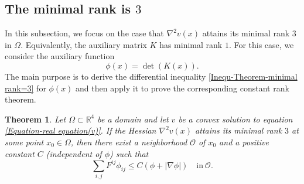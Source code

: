 \documentclass[11pt]{amsart}
\newtheorem{theorem}{Theorem}
\numberwithin{theorem}{section}
\numberwithin{equation}{section}
\begin{document}
\subsection{The minimal rank is $3$}\label{Section 3.2}
In this subsection, we focus on the case that $\nabla^2v(x)$ attains its minimal rank $3$ in $\Omega$. Equivalently, the auxiliary matrix $K$ has minimal rank $1$. For this case, we consider the auxiliary function $$\phi(x)=\det(K(x)). $$ The main purpose is to derive the differential inequality \eqref{Inequ-Theorem-minimal rank=3} for $\phi(x)$ and then apply it to prove the corresponding constant rank theorem.
\begin{theorem}\label{Theorem-minimal rank is 3}
Let $\Omega\subset\mathbb{R}^4$ be a domain and let $v$ be a convex solution to equation \eqref{Equation-real equation(v)}. If the Hessian $\nabla^2v(x)$ attains its minimal rank $3$ at some point $x_0\in\Omega$, then there exist a neighborhood $\mathcal{O}$ of $x_0$ and a positive constant $C$ (independent of $\phi$) such that
\begin{equation}\label{Inequ-Theorem-minimal rank=3}
\sum_{i, j}F^{ij}\phi_{ij}\leq C(\phi+|\nabla\phi|)\quad \mathrm{in} \ \mathcal{O}.
\end{equation}
\end{theorem}
\end{document}
